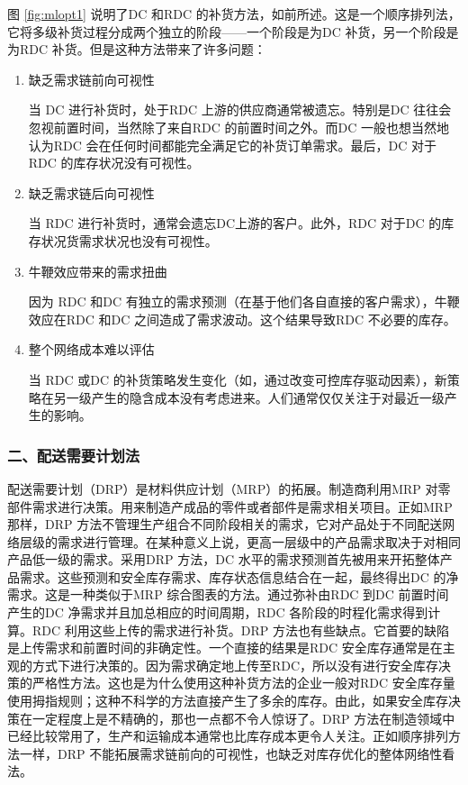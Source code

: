     图 \ref{fig:mlopt1} 说明了DC 和RDC 的补货方法，如前所述。这是一个顺序排列法，它将多级补货过程分成两个独立的阶段——一个阶段是为DC 补货，另一个阶段是为RDC 补货。但是这种方法带来了许多问题：

    \begin{enumerate}
        \item  缺乏需求链前向可视性

        当 DC 进行补货时，处于RDC 上游的供应商通常被遗忘。特别是DC 往往会忽视前置时间，当然除了来自RDC 的前置时间之外。而DC 一般也想当然地认为RDC 会在任何时间都能完全满足它的补货订单需求。最后，DC 对于RDC 的库存状况没有可视性。

        \item  缺乏需求链后向可视性

        当 RDC 进行补货时，通常会遗忘DC上游的客户。此外，RDC 对于DC 的库存状况货需求状况也没有可视性。

        \item  牛鞭效应带来的需求扭曲

        因为 RDC 和DC 有独立的需求预测（在基于他们各自直接的客户需求），牛鞭效应在RDC 和DC 之间造成了需求波动。这个结果导致RDC 不必要的库存。

        \item  整个网络成本难以评估

        当 RDC 或DC 的补货策略发生变化（如，通过改变可控库存驱动因素），新策略在另一级产生的隐含成本没有考虑进来。人们通常仅仅关注于对最近一级产生的影响。
    \end{enumerate}

\subsubsection { 二、配送需要计划法}

    配送需要计划（DRP）是材料供应计划（MRP）的拓展。制造商利用MRP 对零部件需求进行决策。用来制造产成品的零件或者部件是需求相关项目。正如MRP 那样，DRP 方法不管理生产组合不同阶段相关的需求，它对产品处于不同配送网络层级的需求进行管理。在某种意义上说，更高一层级中的产品需求取决于对相同产品低一级的需求。采用DRP 方法，DC 水平的需求预测首先被用来开拓整体产品需求。这些预测和安全库存需求、库存状态信息结合在一起，最终得出DC 的净需求。这是一种类似于MRP 综合图表的方法。通过弥补由RDC 到DC 前置时间产生的DC 净需求并且加总相应的时间周期，RDC 各阶段的时程化需求得到计算。RDC 利用这些上传的需求进行补货。DRP 方法也有些缺点。它首要的缺陷是上传需求和前置时间的非确定性。一个直接的结果是RDC 安全库存通常是在主观的方式下进行决策的。因为需求确定地上传至RDC，所以没有进行安全库存决策的严格性方法。这也是为什么使用这种补货方法的企业一般对RDC 安全库存量使用拇指规则；这种不科学的方法直接产生了多余的库存。由此，如果安全库存决策在一定程度上是不精确的，那也一点都不令人惊讶了。DRP 方法在制造领域中已经比较常用了，生产和运输成本通常也比库存成本更令人关注。正如顺序排列方法一样，DRP 不能拓展需求链前向的可视性，也缺乏对库存优化的整体网络性看法。

